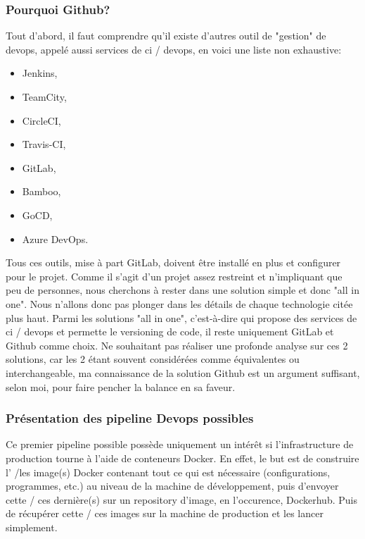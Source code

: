 \documentclass[
    iai, %
    il, %
]{heig-tb}
\begin{document}
\subsubsection{Pourquoi Github?}
Tout d'abord, il faut comprendre qu'il existe d'autres outil de "gestion" de \Gls{devops}, appelé aussi services de \Gls{ci} / \Gls{devops}, en voici une liste non exhaustive:
\begin{itemize}
    \item Jenkins, %
    \item TeamCity, %
    \item CircleCI, %
    \item Travis-CI, %
    \item GitLab, %
    \item Bamboo, %
    \item GoCD, %
    \item Azure DevOps. %
\end{itemize}

Tous ces outils, mise à part GitLab, doivent être installé en plus et configurer pour le projet.
Comme il s'agit d'un projet assez restreint et n'impliquant que peu de personnes, nous cherchons à rester dans une solution simple et donc "all in one".
Nous n'allons donc pas plonger dans les détails de chaque technologie citée plus haut.
Parmi les solutions "all in one", c'est-à-dire qui propose des services de \Gls{ci} / \Gls{devops} et permette le versioning de code, il reste uniquement GitLab et Github comme choix.
Ne souhaitant pas réaliser une profonde analyse sur ces 2 solutions, car les 2 étant souvent considérées comme équivalentes ou interchangeable, ma connaissance de la solution Github est un argument suffisant, selon moi, pour faire pencher la balance en sa faveur.

\subsubsection{Présentation des pipeline Devops possibles}
Ce premier pipeline possible possède uniquement un intérêt si l'infrastructure de production tourne à l'aide de conteneurs Docker. En effet, le but est de construire l' /les image(s) Docker contenant tout ce qui est nécessaire (configurations, programmes, etc.) au niveau de la machine de développement, puis d'envoyer cette / ces dernière(s) sur un repository d'image, en l'occurence, Dockerhub. Puis de récupérer cette / ces images sur la machine de production et les lancer simplement.
\end{document}
